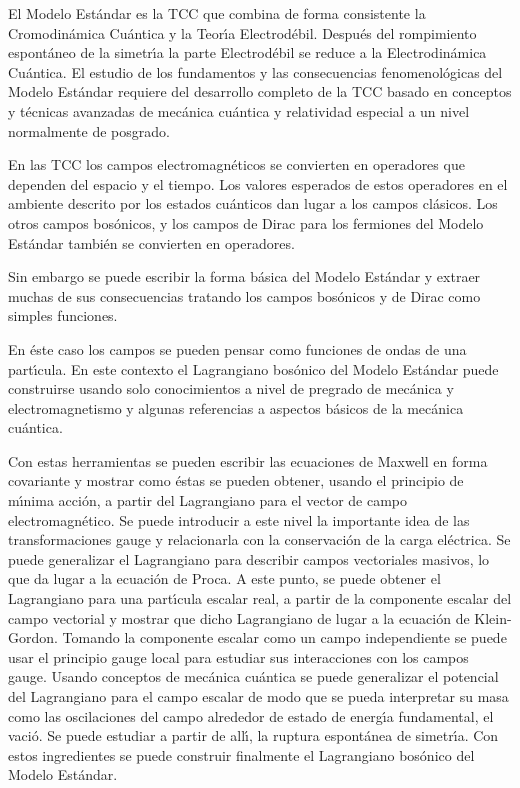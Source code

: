 El Modelo Est\'andar es la TCC que combina de forma consistente la Cromodin\'amica Cu\'antica y la Teor\'\i a Electrod\'ebil. Despu\'es del rompimiento espont\'aneo de la simetr\'\i a la parte Electrod\'ebil se reduce a la Electrodin\'amica Cu\'antica. El estudio de los fundamentos y las consecuencias fenomenol\'ogicas del Modelo Est\'andar requiere del desarrollo completo de la TCC basado en conceptos y t\'ecnicas avanzadas de mec\'anica cu\'antica y relatividad especial a un nivel normalmente de posgrado. 

En las TCC los campos electromagn\'eticos se convierten en operadores que dependen del espacio y el tiempo. Los valores esperados de estos operadores en el ambiente descrito por los estados cu\'anticos dan lugar a los campos cl\'asicos. Los otros campos bos\'onicos, y los campos de Dirac para los fermiones del Modelo Est\'andar tambi\'en se convierten en operadores. 

Sin embargo se puede  escribir la forma b\'asica del Modelo Est\'andar y extraer muchas de sus consecuencias tratando los campos bos\'onicos y de Dirac como simples funciones. 

En \'este caso los campos se pueden pensar como funciones de ondas de una part\'\i cula. En este contexto el Lagrangiano bos\'onico del Modelo Est\'andar puede construirse usando solo conocimientos a nivel de pregrado de mec\'anica y electromagnetismo y  algunas referencias a aspectos b\'asicos de la mec\'anica cu\'antica. 

Con estas herramientas se pueden escribir las ecuaciones de Maxwell en forma covariante y mostrar como \'estas se pueden obtener, usando el principio de m\'\i nima acci\'on, a partir del Lagrangiano para el vector de campo electromagn\'etico. Se puede introducir a este nivel la importante idea de las transformaciones gauge y relacionarla con la conservaci\'on de la carga el\'ectrica. Se puede generalizar el Lagrangiano  para describir campos vectoriales masivos, lo que da lugar a la ecuaci\'on de Proca. A este punto, se puede obtener el Lagrangiano para una part\'\i cula escalar real, a partir de la componente escalar del campo vectorial y mostrar que dicho Lagrangiano de lugar a la ecuaci\'on de Klein-Gordon. Tomando la componente escalar como un campo independiente se puede usar el principio gauge local para estudiar sus interacciones con los campos gauge. Usando conceptos de mec\'anica cu\'antica se puede generalizar el potencial del Lagrangiano para el campo escalar de modo que se pueda  interpretar su masa como las oscilaciones del campo alrededor de estado de energ\'\i a fundamental, el vaci\'o. Se puede estudiar a partir de all\'\i, la ruptura espont\'anea de simetr\'\i a. Con estos ingredientes se puede construir finalmente el Lagrangiano bos\'onico del Modelo Est\'andar. 

